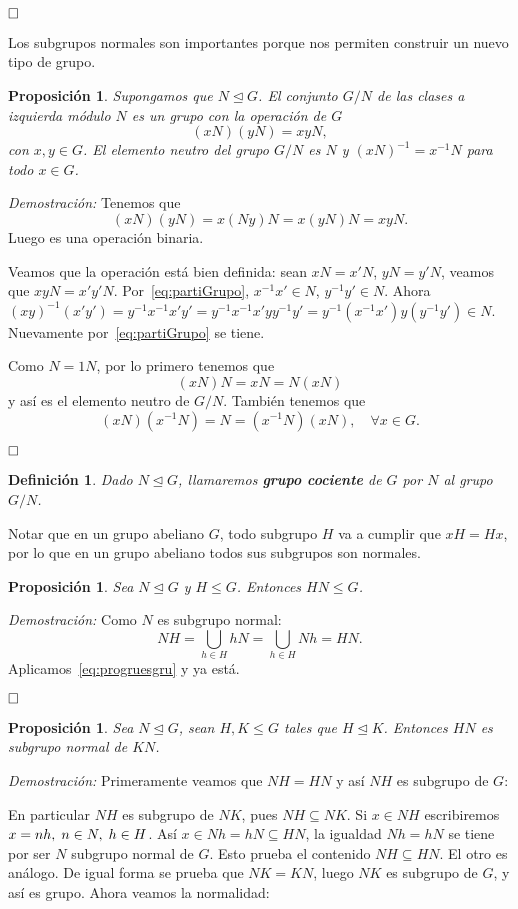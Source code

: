 \documentclass[12pt]{article}
\newtheorem{proposition}[theorem]{Proposición}
\newtheorem{definition}[theorem]{Definición}
\begin{document}
$\hfill \square$

Los subgrupos normales son importantes porque nos permiten construir un nuevo tipo de grupo.

\begin{proposition}\label{eq:cociente} Supongamos que $N \unlhd G$. El conjunto $G/N$ de las clases a izquierda módulo $N$ es un grupo con la operación de $G$ 
$$(xN)(yN)=xyN,$$ con $x,y \in G$. El elemento neutro del grupo $G/N$ es $N$ y $(xN)^{-1} = x^{-1}N$ para todo $x \in G$.
\end{proposition}
\emph{Demostración: }Tenemos que $$(xN)(yN)=x(Ny)N = x(yN)N = xyN.$$ Luego es una operación binaria. 

Veamos que la operación está bien definida: sean $xN = x'N$, $yN = y'N$, veamos que $xyN = x'y'N$. Por~\ref{eq:partiGrupo}, $x^{-1}x' \in N$, $y^{-1}y' \in N$. Ahora $(xy)^{-1}(x'y') = y^{-1}x^{-1}x'y' = y^{-1}x^{-1}x'yy^{-1}y'=y^{-1}(x^{-1}x')y(y^{-1}y') \in N$. Nuevamente por~\ref{eq:partiGrupo} se tiene.

Como $N = 1N$, por lo primero tenemos que $$(xN)N=xN = N(xN)$$ y así es el elemento neutro de $G/N$. También tenemos que $$(xN)(x^{-1}N) = N = (x^{-1}N)(xN),\quad \forall x\in G.$$

$\hfill \square$

\begin{definition}Dado $N \unlhd G$, llamaremos \textbf{grupo cociente} de $G$ por $N$ al grupo $G/N$.
\end{definition}

Notar que en un grupo abeliano $G$, todo subgrupo $H$ va a cumplir que $xH = Hx$, por lo que en un grupo abeliano todos sus subgrupos son normales.

\begin{proposition}Sea $N \unlhd G$ y $H \leq G$. Entonces $HN \leq G$.
\end{proposition}
\emph{Demostración: }Como $N$ es subgrupo normal: $$NH = \bigcup_{h\in H} hN = \bigcup_{h\in H} Nh = HN.$$ Aplicamos~\ref{eq:progruesgru} y ya está.

$\hfill \square$

\begin{proposition}\label{eq:ej218} Sea $N \unlhd G$, sean $H, K \leq G$ tales que $H \unlhd K$. Entonces $HN$ es subgrupo normal de $KN$.
\end{proposition}
\emph{Demostración: }Primeramente veamos que $NH=HN$ y así $NH$ es subgrupo de $G$:

En particular $NH$ es subgrupo de $NK$, pues $NH \subseteq NK$. Si $x \in NH$ escribiremos $x = nh, \hspace{0.1cm} n \in N, \hspace{0.1cm} h \in H$. Así $x \in Nh = hN \subseteq HN$, la igualdad $Nh = hN$ se tiene por ser $N$ subgrupo normal de $G$. Esto prueba el contenido $NH \subseteq HN$. El otro es análogo. De igual forma se prueba que $NK = KN$, luego $NK$ es subgrupo de $G$, y así es grupo. Ahora veamos la normalidad:
\end{document}

